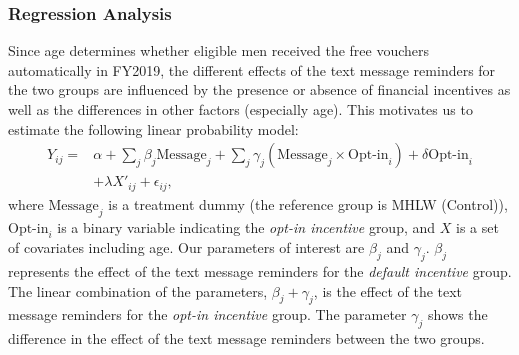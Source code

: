 \documentclass[
      12pt,
    a4paper
]{article}
\begin{document}
\hypertarget{regression-analysis}{%
\subsubsection{Regression Analysis}\label{regression-analysis}}

Since age determines whether eligible men received the free vouchers automatically in FY2019, the different effects of the text message reminders for the two groups are influenced by the presence or absence of financial incentives as well as the differences in other factors (especially age). This motivates us to estimate the following linear probability model:
\begin{equation}
\begin{split}
Y_{ij} = &\alpha + \sum_j \beta_j \text{Message}_j + \sum_j \gamma_j (\text{Message}_j \times \text{Opt-in}_i) + \delta \text{Opt-in}_i \\
&+ \lambda X'_{ij} + \epsilon_{ij},
\end{split} \label{eq:regression}
\end{equation}
where \(\text{Message}_j\) is a treatment dummy (the reference group is MHLW (Control)), \(\text{Opt-in}_i\) is a binary variable indicating the \emph{opt-in incentive} group, and \(X\) is a set of covariates including age. Our parameters of interest are \(\beta_j\) and \(\gamma_j\). \(\beta_j\) represents the effect of the text message reminders for the \emph{default incentive} group. The linear combination of the parameters, \(\beta_j + \gamma_j\), is the effect of the text message reminders for the \emph{opt-in incentive} group. The parameter \(\gamma_j\) shows the difference in the effect of the text message reminders between the two groups.
\end{document}
